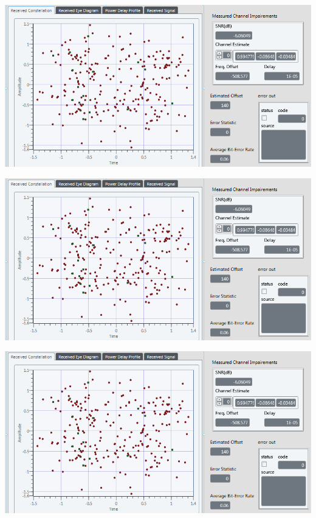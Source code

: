 \documentclass[frenchb, oneside, headings=normal]{scrartcl}
\begin{document}
  \begin{minipage}[b]{0.48\linewidth}
        \centering \includegraphics[scale=0.55]{img/Sliding_correletaion_OFF_AWGN_5dB_shift_bit_0}
    
    \end{minipage}\hfill
    \begin{minipage}[b]{0.48\linewidth}
         \centering \includegraphics[scale=0.55]{img/Sliding_correletaion_OFF_AWGN_5dB_shift_bit_0}
    \end{minipage}
    \begin{minipage}[b]{0.48\linewidth}
        \centering \includegraphics[scale=0.55]{img/Sliding_correletaion_OFF_AWGN_5dB_shift_bit_0.png}
    
    \end{minipage}\hfill
\end{document}
